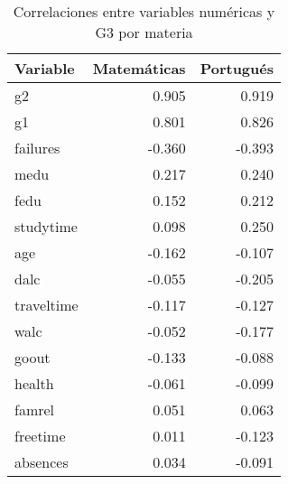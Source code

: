 \documentclass[
]{book}
\begin{document}
\begin{table}

\caption{\label{tab:numeric-bivariate}Correlaciones entre variables numéricas y G3 por materia}
\centering
\begin{tabular}[t]{l|r|r}
\hline
Variable & Matemáticas & Portugués\\
\hline
g2 & 0.905 & 0.919\\
\hline
g1 & 0.801 & 0.826\\
\hline
failures & -0.360 & -0.393\\
\hline
medu & 0.217 & 0.240\\
\hline
fedu & 0.152 & 0.212\\
\hline
studytime & 0.098 & 0.250\\
\hline
age & -0.162 & -0.107\\
\hline
dalc & -0.055 & -0.205\\
\hline
traveltime & -0.117 & -0.127\\
\hline
walc & -0.052 & -0.177\\
\hline
goout & -0.133 & -0.088\\
\hline
health & -0.061 & -0.099\\
\hline
famrel & 0.051 & 0.063\\
\hline
freetime & 0.011 & -0.123\\
\hline
absences & 0.034 & -0.091\\
\hline
\end{tabular}
\end{table}
\end{document}
